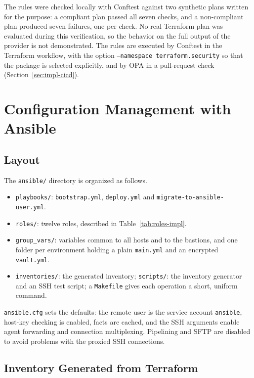 The rules were checked locally with Conftest against two synthetic plans written for the purpose: a compliant plan passed all seven checks, and a non-compliant plan produced seven failures, one per check. No real Terraform plan was evaluated during this verification, so the behavior on the full output of the provider is not demonstrated. The rules are executed by Conftest in the Terraform workflow, with the option \texttt{--namespace terraform.security} so that the package is selected explicitly, and by OPA in a pull-request check (Section~\ref{sec:impl-cicd}).


\section{Configuration Management with Ansible}
\label{sec:impl-ansible}

\subsection{Layout}

The \texttt{ansible/} directory is organized as follows.
\begin{itemize}
  \item \texttt{playbooks/}: \texttt{bootstrap.yml}, \texttt{deploy.yml} and \texttt{migrate-to-ansible-user.yml}.
  \item \texttt{roles/}: twelve roles, described in Table~\ref{tab:roles-impl}.
  \item \texttt{group\_vars/}: variables common to all hosts and to the bastions, and one folder per environment holding a plain \texttt{main.yml} and an encrypted \texttt{vault.yml}.
  \item \texttt{inventories/}: the generated inventory; \texttt{scripts/}: the inventory generator and an SSH test script; a \texttt{Makefile} gives each operation a short, uniform command.
\end{itemize}
\texttt{ansible.cfg} sets the defaults: the remote user is the service account \texttt{ansible}, host-key checking is enabled, facts are cached, and the SSH arguments enable agent forwarding and connection multiplexing. Pipelining and SFTP are disabled to avoid problems with the proxied SSH connections.

\subsection{Inventory Generated from Terraform}

